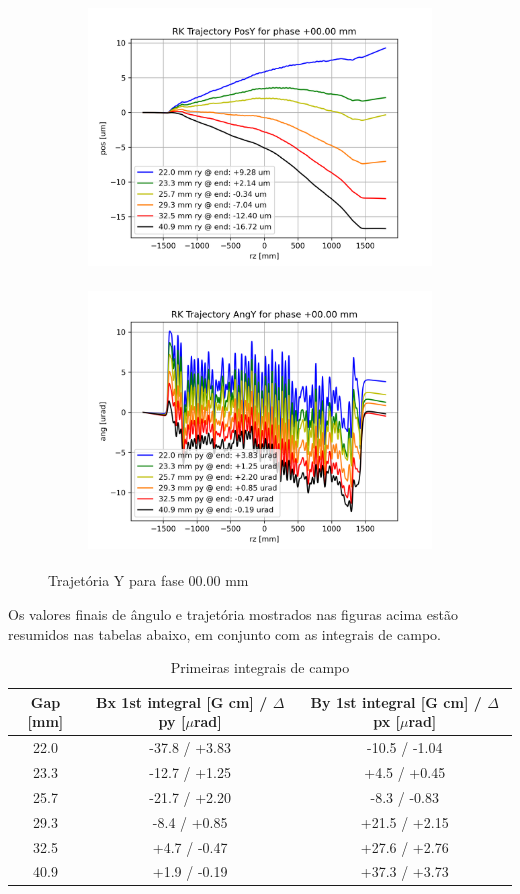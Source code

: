 \documentclass[a4paper,12pt]{article}
\begin{document}
\begin{figure}[H]
\begin{subfigure}{0.5\textwidth}
\includegraphics[width=0.9\linewidth, height=7cm]{figs/phase0 RK Posy.png} 
\label{fig:subim10ty}
\end{subfigure}
\begin{subfigure}{0.5\textwidth}
\includegraphics[width=0.9\linewidth, height=7cm]{figs/phase0 RK Angy.png}
\label{fig:subim20ty}
\end{subfigure}
\caption{Trajetória Y para fase 00.00 mm}
\label{fig:trajy0}
\end{figure}

Os valores finais de ângulo e trajetória mostrados nas figuras acima estão resumidos nas tabelas abaixo, em conjunto com as integrais de campo.


\begin{table}[H]
\centering
\caption{Primeiras integrais de campo}
\begin{tabular}{|c|c|c|}
\hline
   Gap [mm] & Bx 1st integral [G cm] / $\Delta$ py [$\mu$rad] & By 1st integral [G cm] / $\Delta$ px [$\mu$rad] \\
\hline
    22.0 & -37.8 / +3.83 & -10.5 / -1.04 \\
    23.3 & -12.7 / +1.25 &  +4.5 / +0.45 \\
    25.7 & -21.7 / +2.20 &  -8.3 / -0.83 \\
    29.3 &  -8.4 / +0.85 & +21.5 / +2.15 \\
    32.5 &  +4.7 / -0.47 & +27.6 / +2.76 \\
    40.9 &  +1.9 / -0.19 & +37.3 / +3.73 \\
\hline
\end{tabular}
\end{table}
\end{document}
